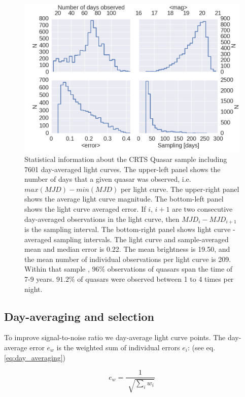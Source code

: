 \documentclass[fleqn,usenatbib]{mnras}  %
\begin{document}
\begin{figure}
\label{fig:CRTS_QSO_stats}
 \includegraphics[width=\columnwidth]{Fig_1_Stats_CRTS_QSO_used.png}
 \caption{Statistical information about the CRTS Quasar sample including 7601 day-averaged light curves. The upper-left panel shows the number of days that a given quasar was observed, i.e. $max(MJD)-min(MJD)$ per light curve. The upper-right panel shows the average light curve magnitude. The bottom-left panel shows the light curve averaged error. If $i$, $i+1$ are two consecutive day-averaged observations in the light curve, then $MJD_{i} - MJD_{i+1}$ is the sampling interval. The bottom-right panel shows light curve - averaged sampling intervals. The light curve and sample-averaged mean and median error is 0.22. The mean  brightness is 19.50, and the mean number of individual observations per light curve  is 209. Within that sample , $96 \% $ observations of quasars span the time of 7-9 years.  $91.2\%$ of  quasars were observed between 1 to 4 times per night.}
\end{figure}



\subsection{Day-averaging and selection}
\label{sec:sample_sel}


To improve signal-to-noise ratio we day-average light curve points. The day-average error $e_{w}$ is the weighted sum of individual errors $e_{i}$:  (see eq.\ref{eq:day_averaging})


\begin{equation}
\label{eq:day_averaging}
 e_{w} = \frac{1}{\sqrt[]{\sum_{i} w_{i}}}
\end{equation}
\end{document}

